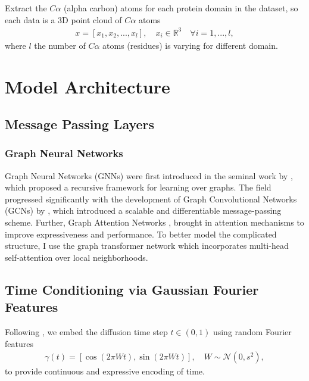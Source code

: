 \documentclass[12pt]{report}
\begin{document}
Extract the \(C\alpha\) (alpha carbon) atoms for each protein domain in the dataset, so each data is a 3D point cloud of \(C\alpha\) atoms
\begin{align*}
    x = \left[x_1,x_2,...,x_l\right],\quad x_i\in\mathbb{R}^3\quad\forall i=1,...,l,
\end{align*}
where \(l\) the number of \(C\alpha\) atoms (residues) is varying for different domain.
\section{Model Architecture}
\subsection{Message Passing Layers}
\subsubsection{Graph Neural Networks}
Graph Neural Networks (GNNs) were first introduced in the seminal work by \cite{scarselliGraphNeuralNetwork2009}, which proposed a recursive framework for learning over graphs. The field progressed significantly with the development of Graph Convolutional Networks (GCNs) by \cite{kipfSemiSupervisedClassificationGraph2017}, which introduced a scalable and differentiable message-passing scheme. Further, Graph Attention Networks \cite{velickovicGraphAttentionNetworks2018}, brought in attention mechanisms to improve expressiveness and performance. To better model the complicated structure, I use the graph transformer network \cite{shiMaskedLabelPrediction2021} which incorporates multi-head self-attention over local neighborhoods.
\subsection{Time Conditioning via Gaussian Fourier Features}
Following \cite{song2020score}, we embed the diffusion time step \(t\in\left(0,1\right)\) using random Fourier features \cite{tancikFourierFeaturesLet2020}
\begin{align*}
    \gamma\left(t\right)=\left[\cos\left(2\pi Wt\right),\sin\left(2\pi Wt\right)\right],\quad W\sim\mathcal{N}\left(0,s^2\right),
\end{align*}
to provide continuous and expressive encoding of time.
\end{document}
